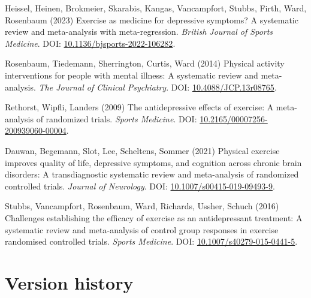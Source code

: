 \documentclass[
  letterpaper,
  DIV=11,
  numbers=noendperiod]{scrartcl}
\newlength{\cslhangindent}
\newenvironment{CSLReferences}[2] %
 {\begin{list}{}{%
  \setlength{\itemindent}{0pt}
  \setlength{\leftmargin}{0pt}
  \setlength{\parsep}{0pt}
  \ifodd #1
   \setlength{\leftmargin}{\cslhangindent}
   \setlength{\itemindent}{-1\cslhangindent}
  \fi
  \setlength{\itemsep}{#2\baselineskip}}}
 {\end{list}}
\begin{document}
\begin{CSLReferences}{0}{1}
{Heissel, Heinen, Brokmeier, Skarabis, Kangas, Vancampfort, Stubbs,
Firth, Ward, Rosenbaum} (2023) Exercise as medicine for depressive
symptoms? A systematic review and meta-analysis with meta-regression.
\emph{British Journal of Sports Medicine}. DOI:
\href{https://doi.org/10.1136/bjsports-2022-106282}{10.1136/bjsports-2022-106282}.

Rosenbaum, Tiedemann, Sherrington, Curtis, Ward (2014) Physical activity
interventions for people with mental illness: A systematic review and
meta-analysis. \emph{The Journal of Clinical Psychiatry}. DOI:
\href{https://doi.org/10.4088/JCP.13r08765}{10.4088/JCP.13r08765}.

Rethorst, Wipfli, Landers (2009) The antidepressive effects of exercise:
A meta-analysis of randomized trials. \emph{Sports Medicine}. DOI:
\href{https://doi.org/10.2165/00007256-200939060-00004}{10.2165/00007256-200939060-00004}.

Dauwan, Begemann, Slot, Lee, Scheltens, Sommer (2021) Physical exercise
improves quality of life, depressive symptoms, and cognition across
chronic brain disorders: A transdiagnostic systematic review and
meta-analysis of randomized controlled trials. \emph{Journal of
Neurology}. DOI:
\href{https://doi.org/10.1007/s00415-019-09493-9}{10.1007/s00415-019-09493-9}.

Stubbs, Vancampfort, Rosenbaum, Ward, Richards, Ussher, Schuch (2016)
Challenges establishing the efficacy of exercise as an antidepressant
treatment: A systematic review and meta-analysis of control group
responses in exercise randomised controlled trials. \emph{Sports
Medicine}. DOI:
\href{https://doi.org/10.1007/s40279-015-0441-5}{10.1007/s40279-015-0441-5}.

\end{CSLReferences}

\clearpage

\section*{Version history}\label{version-history}
\end{document}
